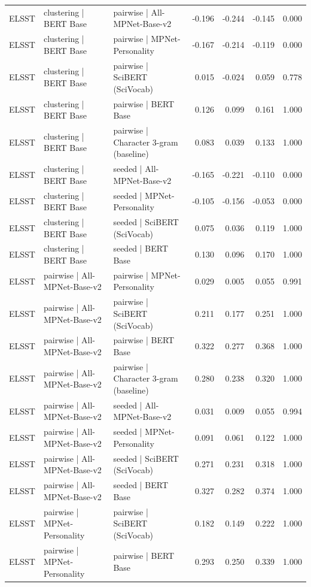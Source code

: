 \begin{table}[ht]
\begin{tabular}{lllrrrr}
ELSST & clustering | BERT Base & pairwise | All-MPNet-Base-v2 & -0.196 & -0.244 & -0.145 & 0.000 \\
ELSST & clustering | BERT Base & pairwise | MPNet-Personality & -0.167 & -0.214 & -0.119 & 0.000 \\
ELSST & clustering | BERT Base & pairwise | SciBERT (SciVocab) & 0.015 & -0.024 & 0.059 & 0.778 \\
ELSST & clustering | BERT Base & pairwise | BERT Base & 0.126 & 0.099 & 0.161 & 1.000 \\
ELSST & clustering | BERT Base & pairwise | Character 3-gram (baseline) & 0.083 & 0.039 & 0.133 & 1.000 \\
ELSST & clustering | BERT Base & seeded | All-MPNet-Base-v2 & -0.165 & -0.221 & -0.110 & 0.000 \\
ELSST & clustering | BERT Base & seeded | MPNet-Personality & -0.105 & -0.156 & -0.053 & 0.000 \\
ELSST & clustering | BERT Base & seeded | SciBERT (SciVocab) & 0.075 & 0.036 & 0.119 & 1.000 \\
ELSST & clustering | BERT Base & seeded | BERT Base & 0.130 & 0.096 & 0.170 & 1.000 \\
ELSST & pairwise | All-MPNet-Base-v2 & pairwise | MPNet-Personality & 0.029 & 0.005 & 0.055 & 0.991 \\
ELSST & pairwise | All-MPNet-Base-v2 & pairwise | SciBERT (SciVocab) & 0.211 & 0.177 & 0.251 & 1.000 \\
ELSST & pairwise | All-MPNet-Base-v2 & pairwise | BERT Base & 0.322 & 0.277 & 0.368 & 1.000 \\
ELSST & pairwise | All-MPNet-Base-v2 & pairwise | Character 3-gram (baseline) & 0.280 & 0.238 & 0.320 & 1.000 \\
ELSST & pairwise | All-MPNet-Base-v2 & seeded | All-MPNet-Base-v2 & 0.031 & 0.009 & 0.055 & 0.994 \\
ELSST & pairwise | All-MPNet-Base-v2 & seeded | MPNet-Personality & 0.091 & 0.061 & 0.122 & 1.000 \\
ELSST & pairwise | All-MPNet-Base-v2 & seeded | SciBERT (SciVocab) & 0.271 & 0.231 & 0.318 & 1.000 \\
ELSST & pairwise | All-MPNet-Base-v2 & seeded | BERT Base & 0.327 & 0.282 & 0.374 & 1.000 \\
ELSST & pairwise | MPNet-Personality & pairwise | SciBERT (SciVocab) & 0.182 & 0.149 & 0.222 & 1.000 \\
ELSST & pairwise | MPNet-Personality & pairwise | BERT Base & 0.293 & 0.250 & 0.339 & 1.000 \\

\end{tabular}
\end{table}
